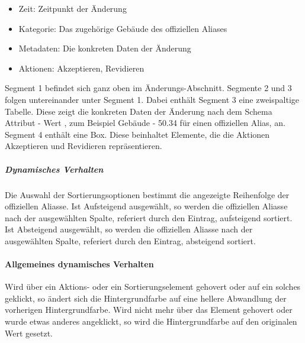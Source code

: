 \begin{itemize}
    \item Zeit: Zeitpunkt der Änderung
    \item Kategorie: Das zugehörige Gebäude des offiziellen Aliases
    \item Metadaten: Die konkreten Daten der Änderung
    \item Aktionen: Akzeptieren, Revidieren
\end{itemize}

Segment 1 befindet sich ganz oben im Änderungs-Abschnitt. Segmente 2 und 3 folgen untereinander unter Segment 1.
Dabei enthält Segment 3 eine zweispaltige Tabelle. Diese zeigt die konkreten Daten der Änderung nach dem Schema \dq Attribut - Wert \dq{}, zum Beispiel \dq Gebäude - 50.34 \dq{} für einen offiziellen Alias, an.
Segment 4 enthält eine Box. Diese beinhaltet Elemente, die die Aktionen \dq Akzeptieren \dq{} und \dq Revidieren \dq{} repräsentieren.

\subparagraph*{Dynamisches Verhalten}
Die Auswahl der Sortierungsoptionen bestimmt die angezeigte Reihenfolge der offiziellen Aliasse.
Ist \dq Aufsteigend \dq{} ausgewählt, so werden die offiziellen Aliasse nach der ausgewählten Spalte, referiert durch den Eintrag, aufsteigend sortiert.
Ist \dq Absteigend \dq{} ausgewählt, so werden die offiziellen Aliasse nach der ausgewählten Spalte, referiert durch den Eintrag, absteigend sortiert.

\paragraph*{Allgemeines dynamisches Verhalten}
Wird über ein Aktions- oder ein Sortierungselement gehovert oder auf ein solches geklickt, so ändert sich die Hintergrundfarbe auf eine hellere Abwandlung der vorherigen Hintergrundfarbe.
Wird nicht mehr über das Element gehovert oder wurde etwas anderes angeklickt, so wird die Hintergrundfarbe auf den originalen Wert gesetzt.
